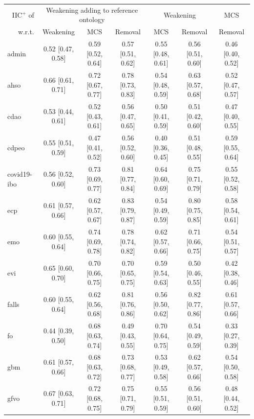\begin{table}[ht]
  \scriptsize
  \begin{widepage}
    \centering
    \begin{tabular}{|l|cccccc|}
      \cline{2-7}
      \multicolumn{1}{r|}{IIC$^+$ of} & \multicolumn{3}{c}{Weakening adding to reference ontology} & \multicolumn{2}{c}{Weakening} & MCS \\
      \multicolumn{1}{r|}{w.r.t.} & Weakening & MCS & Removal & MCS & Removal & Removal \\
      \hline
      admin & 0.52 [0.47, 0.58] & 0.59 [0.52, 0.64] & 0.57 [0.51, 0.62] & 0.55 [0.48, 0.61] & 0.56 [0.51, 0.60] & 0.46 [0.40, 0.52] \\
      ahso & 0.66 [0.61, 0.71] & 0.72 [0.67, 0.77] & 0.78 [0.73, 0.83] & 0.54 [0.48, 0.59] & 0.63 [0.57, 0.68] & 0.52 [0.47, 0.57] \\
      cdao & 0.53 [0.44, 0.61] & 0.52 [0.43, 0.61] & 0.56 [0.47, 0.65] & 0.50 [0.41, 0.59] & 0.51 [0.42, 0.60] & 0.47 [0.40, 0.55] \\
      cdpeo & 0.55 [0.51, 0.59] & 0.47 [0.41, 0.52] & 0.56 [0.52, 0.60] & 0.40 [0.36, 0.45] & 0.51 [0.48, 0.55] & 0.59 [0.55, 0.64] \\
      covid19-ibo & 0.56 [0.52, 0.60] & 0.73 [0.69, 0.77] & 0.81 [0.77, 0.84] & 0.64 [0.60, 0.69] & 0.75 [0.71, 0.79] & 0.55 [0.52, 0.58] \\
      ecp & 0.61 [0.57, 0.66] & 0.62 [0.57, 0.67] & 0.83 [0.79, 0.87] & 0.54 [0.49, 0.59] & 0.80 [0.75, 0.85] & 0.58 [0.54, 0.61] \\
      emo & 0.60 [0.55, 0.64] & 0.74 [0.69, 0.78] & 0.78 [0.74, 0.82] & 0.62 [0.57, 0.66] & 0.71 [0.66, 0.75] & 0.54 [0.51, 0.57] \\
      evi & 0.65 [0.60, 0.70] & 0.70 [0.66, 0.75] & 0.70 [0.65, 0.75] & 0.59 [0.54, 0.63] & 0.50 [0.46, 0.55] & 0.42 [0.38, 0.46] \\
      falls & 0.60 [0.55, 0.64] & 0.62 [0.56, 0.68] & 0.81 [0.76, 0.86] & 0.56 [0.50, 0.62] & 0.82 [0.77, 0.86] & 0.61 [0.57, 0.66] \\
      fo & 0.44 [0.39, 0.50] & 0.68 [0.63, 0.74] & 0.49 [0.43, 0.55] & 0.70 [0.64, 0.75] & 0.54 [0.49, 0.59] & 0.33 [0.27, 0.39] \\
      gbm & 0.61 [0.57, 0.66] & 0.68 [0.63, 0.72] & 0.73 [0.68, 0.77] & 0.53 [0.49, 0.58] & 0.62 [0.57, 0.66] & 0.54 [0.50, 0.58] \\
      gfvo & 0.67 [0.63, 0.71] & 0.72 [0.68, 0.75] & 0.75 [0.71, 0.79] & 0.55 [0.51, 0.59] & 0.56 [0.51, 0.60] & 0.48 [0.44, 0.52] \\

\end{tabular}
\end{widepage}
\end{table}
